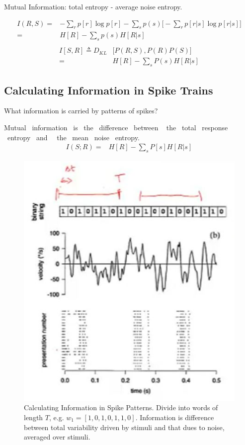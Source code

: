 \documentclass[]{article}
\begin{document}
Mutual Information: total entropy - average noise entropy.

\begin{align*}
	I(R,S) =& -\sum_r p[r] \log p[r] - \sum_s p(s)\big[- \sum_r p[r \vert s] \log p[r \vert s]\big]\\
	=& H[R] - \sum_s p(s) H[R\vert s]\\
\end{align*}
\begin{align*}
	I[S,R] \triangleq D_{KL}&\big[P(R,S),P(R)P(S)\big]\\
	=&H[R]-\sum_s P(s) H[R\vert s]
\end{align*}

\subsection{Calculating Information in Spike Trains}

What information is carried by patterns of spikes?

Mutual  information  is  the  difference  between  
the  total  response  entropy  and   the  mean  noise  entropy.
\begin{align*}
	I(S;R) =& H[R] - \sum_s P[s] H[R\vert s]
\end{align*}
\begin{figure}[H]
	\begin{center}
			\caption[Calculating Information in Spike Patterns]{Calculating Information in Spike Patterns. Divide into words of length $T$, e.g. $w_1=[1,0,1,0,1,1,0]$. Information is difference between total variability driven by stimuli and that dues to noise, averaged over stimuli.\cite{strong1998entropy}}
		\includegraphics[width=\textwidth]{calculatingInformationInSpikePatterns}
	\end{center}
\end{figure}
\end{document}
